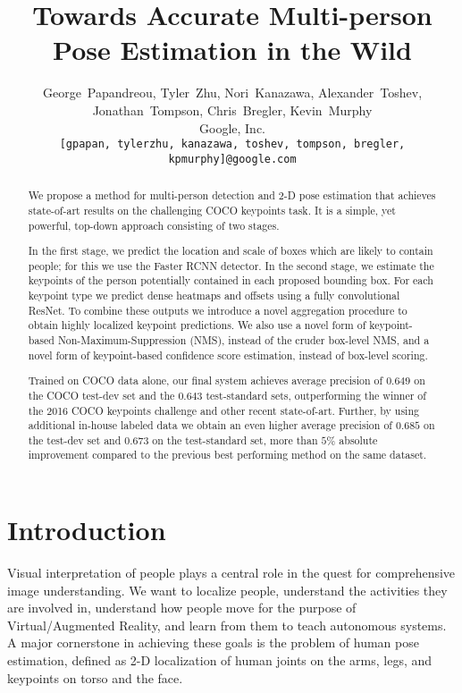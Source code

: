 \documentclass[10pt,twocolumn,letterpaper]{article}
\begin{document}
\title{Towards Accurate Multi-person Pose Estimation in the Wild}

\author{George~Papandreou,
Tyler~Zhu,
Nori~Kanazawa,
Alexander~Toshev,\\
Jonathan~Tompson,
Chris~Bregler,
Kevin~Murphy\\
Google, Inc.\\
{\tt\small [gpapan, tylerzhu, kanazawa, toshev, tompson, bregler, kpmurphy]@google.com}
}

\maketitle




\begin{abstract}
We propose a method for multi-person detection and 2-D pose estimation that achieves state-of-art results on the challenging COCO keypoints task. It is a simple, yet powerful, top-down approach consisting of two stages.

In the first stage, we predict the location and scale of boxes which are likely to contain people; for this we use the Faster RCNN detector. In the second stage, we estimate the keypoints of the person potentially contained in each proposed bounding box. For each keypoint type we predict dense heatmaps and offsets using a fully convolutional ResNet. To combine these outputs we introduce a novel aggregation procedure to obtain highly localized keypoint predictions. We also use a novel form of keypoint-based Non-Maximum-Suppression (NMS), instead of the cruder box-level NMS, and a novel form of keypoint-based confidence score estimation, instead of box-level scoring.

Trained on COCO data alone, our final system achieves average precision of $0.649$ on the COCO test-dev set and the $0.643$ test-standard sets, outperforming the winner of the 2016 COCO keypoints challenge and other recent state-of-art. Further, by using additional in-house labeled data we obtain an even higher average precision of $0.685$ on the test-dev set and $0.673$ on the test-standard set, more than $5\%$ absolute improvement compared to the previous best performing method on the same dataset.
\end{abstract}
 \section{Introduction}

Visual interpretation of people plays a central role in the quest for comprehensive image understanding. We want to localize people, understand the activities they are involved in, understand how people move for the purpose of Virtual/Augmented Reality, and learn from them to teach autonomous systems. A major cornerstone in achieving these goals is the problem of human pose estimation, defined as 2-D localization of human joints on the arms, legs, and keypoints on torso and the face.
\end{document}
